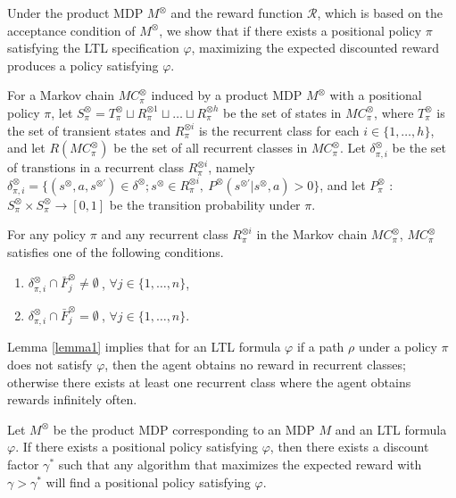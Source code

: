 \documentclass[a4j,12pt,oneside,openany,english]{jsbook}
\begin{document}
Under the product MDP $M^{\otimes}$ and the reward function $\mathcal{R}$, which is based on the acceptance condition of $ M^\otimes $, we show that if there exists a positional policy $\pi$ satisfying the LTL specification $\varphi$, maximizing the expected discounted reward produces a policy satisfying $\varphi$.

For a Markov chain $MC^{\otimes}_{\pi}$ induced by a product MDP $M^{\otimes}$ with a positional policy $\pi$, let $S^{\otimes}_{\pi}= T^{\otimes}_{\pi} \sqcup R^{\otimes 1}_{\pi} \sqcup \ldots \sqcup R^{\otimes h}_{\pi}$ be the set of states in $MC^{\otimes}_{\pi}$, where $T^{\otimes}_{\pi}$ is the set of transient states and $R^{\otimes i}_{\pi}$ is the recurrent class for each $i \in \{ 1, \ldots ,h \}$, and let $R(MC^{\otimes}_{\pi})$ be the set of all recurrent classes in $MC^{\otimes}_{\pi}$. Let $\delta^{\otimes}_{\pi,i}$ be the set of transtions in a recurrent class $R^{\otimes i}_{\pi}$, namely $\delta^{\otimes}_{\pi,i} = \{ (s^{\otimes},a,s^{\otimes \prime}) \in \delta^{\otimes} ; s^{\otimes} \in R^{\otimes i}_{\pi},\ P^{\otimes}(s^{\otimes \prime}|s^{\otimes},a) > 0 \}$, and let $P^{\otimes}_{\pi}$ : $S^{\otimes}_{\pi} \times S^{\otimes}_{\pi} \rightarrow [0,1]$ be the transition probability under $\pi$.

\begin{lemma}
  For any policy $\pi$ and any recurrent class $R^{\otimes i}_{\pi}$ in the Markov chain $MC^{\otimes}_{\pi}$,
  $MC^{\otimes}_{\pi}$ satisfies one of the following conditions.
  \vspace{2mm}
  \begin{enumerate}
    \item $\delta^{\otimes}_{\pi,i} \cap \bar{F}^{\otimes}_j \neq \emptyset\ $, $ \forall j \in \{ 1, \ldots ,n \}$,
    \item $\delta^{\otimes}_{\pi,i} \cap \bar{F}^{\otimes}_j = \emptyset\ $, $ \forall j \in \{ 1, \ldots ,n \}$.
  \end{enumerate}
  \label{lemma1}
\end{lemma}

Lemma \ref{lemma1} implies that for an LTL formula $\varphi$ if a path $\rho$ under a policy $\pi$ does not satisfy $\varphi$, then the agent obtains no reward in recurrent classes; otherwise there exists at least one recurrent class where the agent obtains rewards infinitely often.

\begin{theorem}
  Let $M^{\otimes}$ be the product MDP corresponding to an MDP $M$ and an LTL formula $\varphi$. If there exists a positional policy satisfying $\varphi$, then there exists a discount factor $\gamma^{\ast}$ such that any algorithm that maximizes the expected reward with $\gamma > \gamma^{\ast}$ will find a positional policy satisfying $\varphi$.
  \label{theorem1}
\end{theorem}
\end{document}
